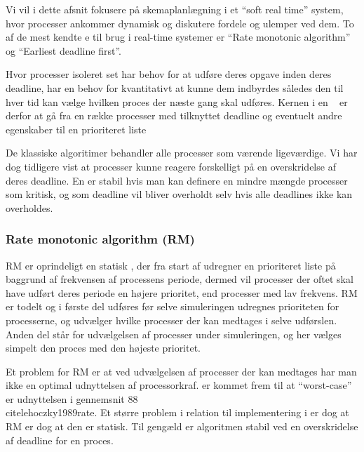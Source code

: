 \begin{shaded}
Vi vil i dette afsnit fokusere på skemaplanlægning i et ``soft real time'' system, hvor processer ankommer dynamisk og diskutere fordele og ulemper ved dem.
To af de mest kendte \sched e til brug i real-time systemer er ``Rate monotonic algorithm''\cite{lehoczky1989rate,liu1973scheduling} og ``Earliest deadline first''\cite{liu1973scheduling}.


Hvor processer isoleret set har behov for at udføre deres opgave inden deres deadline, har \sched en behov for kvantitativt at kunne  dem indbyrdes således den til hver tid kan vælge hvilken proces der næste gang skal udføres. Kernen i en  \sched ~ er derfor at gå fra en række processer med tilknyttet deadline og eventuelt andre egenskaber til en prioriteret liste 

De klassiske algoritimer behandler alle processer som værende ligeværdige. Vi har dog tidligere vist at processer kunne reagere forskelligt på en overskridelse af deres deadline. En \sched er stabil hvis man kan definere en mindre mængde processer som kritisk, og som deadline vil bliver overholdt selv hvis alle deadlines ikke kan overholdes.
\end{shaded}

\subsubsection{Rate monotonic algorithm (RM)}
RM er oprindeligt en statisk \sched, der fra start af udregner en prioriteret liste på baggrund af frekvensen af processens periode, dermed vil processer der oftet skal have udført deres periode en højere prioritet, end processer med lav frekvens. RM er todelt og i første del udføres før selve simuleringen udregnes  prioriteten for processerne, og udvælger hvilke processer der kan medtages i selve udførslen. Anden del står for udvælgelsen af processer  under simuleringen, og her vælges simpelt den proces med den højeste prioritet. 

 Et problem for RM er at ved udvælgelsen af processer der kan medtages har man ikke en optimal udnyttelsen af processorkraf.  er kommet frem til at ``worst-case'' er udnyttelsen i gennemsnit 88\\cite{lehoczky1989rate}. Et større problem i relation til implementering i \pycsp er dog at RM er dog at den er statisk. Til gengæld er algoritmen stabil ved en overskridelse af deadline for en proces. 

